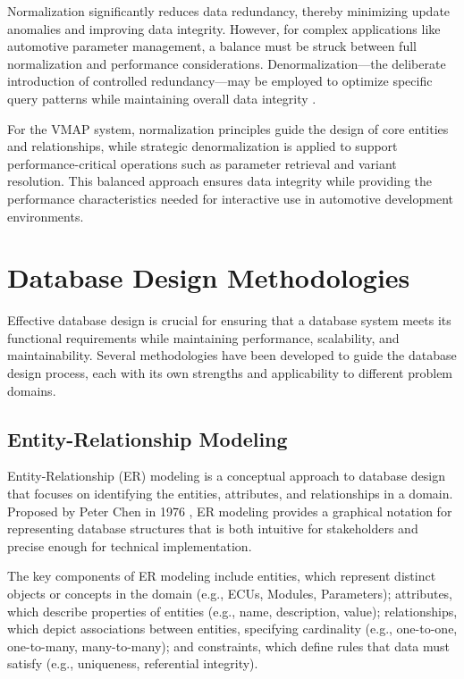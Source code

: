 Normalization significantly reduces data redundancy, thereby minimizing update anomalies and improving data integrity. However, for complex applications like automotive parameter management, a balance must be struck between full normalization and performance considerations. Denormalization—the deliberate introduction of controlled redundancy—may be employed to optimize specific query patterns while maintaining overall data integrity \cite{elmasri2015fundamentals}.

For the VMAP system, normalization principles guide the design of core entities and relationships, while strategic denormalization is applied to support performance-critical operations such as parameter retrieval and variant resolution. This balanced approach ensures data integrity while providing the performance characteristics needed for interactive use in automotive development environments.

\section{Database Design Methodologies}
\label{sec:database-design-methodologies}

Effective database design is crucial for ensuring that a database system meets its functional requirements while maintaining performance, scalability, and maintainability. Several methodologies have been developed to guide the database design process, each with its own strengths and applicability to different problem domains.

\subsection{Entity-Relationship Modeling}
\label{subsec:entity-relationship-modeling}

Entity-Relationship (ER) modeling is a conceptual approach to database design that focuses on identifying the entities, attributes, and relationships in a domain. Proposed by Peter Chen in 1976 \cite{chen1976entity}, ER modeling provides a graphical notation for representing database structures that is both intuitive for stakeholders and precise enough for technical implementation.

The key components of ER modeling include entities, which represent distinct objects or concepts in the domain (e.g., ECUs, Modules, Parameters); attributes, which describe properties of entities (e.g., name, description, value); relationships, which depict associations between entities, specifying cardinality (e.g., one-to-one, one-to-many, many-to-many); and constraints, which define rules that data must satisfy (e.g., uniqueness, referential integrity).

